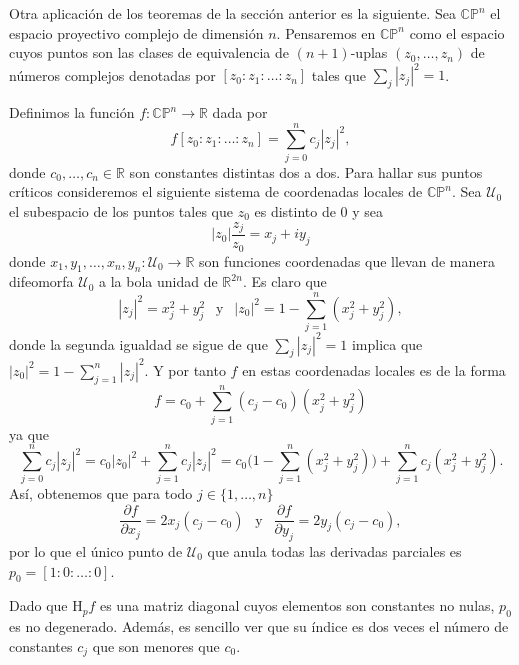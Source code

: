 \newpage

Otra aplicación de los teoremas de la sección anterior es la siguiente. Sea $\mathbb{CP}^n$ el espacio proyectivo complejo de dimensión $n$. Pensaremos en $\mathbb{CP}^n$ como el espacio cuyos puntos son las clases de equivalencia de $(n+1)$-uplas $(z_0,\dots,z_n)$ de números complejos denotadas por $[z_0:z_1:\dots:z_n]$ tales que $\sum_j |z_j|^2=1$. 

Definimos la función $f:\mathbb{CP}^n \to \mathbb{R}$ dada por 
\begin{equation*}
    f[z_0:z_1:\dots:z_n] = \sum_{j=0}^n c_j |z_j|^2,
\end{equation*}
donde $c_0,\dots,c_n\in \mathbb{R}$ son constantes distintas dos a dos. Para hallar sus puntos críticos consideremos el siguiente sistema de coordenadas locales de $\mathbb{CP}^n$. Sea $\mathcal{U}_0$ el subespacio de los puntos tales que $z_0$ es distinto de $0$ y sea 
\begin{equation*}
    |z_0|\frac{z_j}{z_0} = x_j + iy_j
\end{equation*}
donde $x_1,y_1,\dots,x_n,y_n : \mathcal{U}_0\to \mathbb{R}$ son funciones coordenadas que llevan de manera difeomorfa $\mathcal{U}_0$ a la bola unidad de $\mathbb{R}^{2n}$. Es claro que 
\begin{equation*}
    |z_j|^2 = x_j^2 + y_j^2 ~~\text{ y }~~ |z_0|^2 = 1 - \sum_{j=1}^n (x_j^2 + y_j^2),
\end{equation*}
donde la segunda igualdad se sigue de que $\sum_j |z_j|^2=1$ implica que $|z_0|^2 = 1 - \sum_{j=1}^n |z_j|^2 $. Y por tanto $f$ en estas coordenadas locales es de la forma
\begin{equation*}
    f = c_0 + \sum_{j=1}^n (c_j-c_0)(x_j^2 + y_j^2)
\end{equation*}
ya que 
\begin{equation*}
    \sum_{j=0}^n c_j |z_j|^2 = c_0|z_0|^2 + \sum_{j=1}^n c_j |z_j|^2 = c_0 \Big(1 - \sum_{j=1}^n (x_j^2 + y_j^2) \Big) + \sum_{j=1}^n c_j(x_j^2 + y_j^2).
\end{equation*}
Así, obtenemos que para todo $j\in\{1,\dots,n\}$
\begin{equation*}
    \frac{\partial f}{\partial x_j} = 2x_j(c_j - c_0) ~~\text{ y }~~ \frac{\partial f}{\partial y_j} = 2y_j(c_j - c_0),
\end{equation*}
por lo que el único punto de $\mathcal{U}_0$ que anula todas las derivadas parciales es $p_0 = [1:0:\dots:0]$. 

Dado que $\text{H}_p f$ es una matriz diagonal cuyos elementos son constantes no nulas, $p_0$ es no degenerado. Además, es sencillo ver que su índice es dos veces el número de constantes $c_j$ que son menores que $c_0$.

